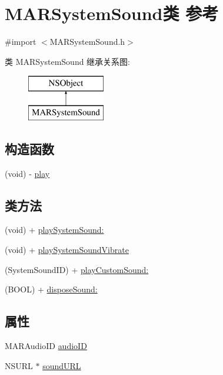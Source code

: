 \hypertarget{interface_m_a_r_system_sound}{}\section{M\+A\+R\+System\+Sound类 参考}
\label{interface_m_a_r_system_sound}


{\ttfamily \#import $<$M\+A\+R\+System\+Sound.\+h$>$}

类 M\+A\+R\+System\+Sound 继承关系图\+:\begin{figure}[H]
\begin{center}
\leavevmode
\includegraphics[height=2.000000cm]{interface_m_a_r_system_sound}
\end{center}
\end{figure}
\subsection*{构造函数}
\begin{DoxyCompactItemize}
\item 
(void) -\/ \hyperlink{interface_m_a_r_system_sound_abf84e563c880dd678ebd9dd2a67f56f0}{play}
\end{DoxyCompactItemize}
\subsection*{类方法}
\begin{DoxyCompactItemize}
\item 
(void) + \hyperlink{interface_m_a_r_system_sound_a448d46b9614cdc1f3025f8913614f866}{play\+System\+Sound\+:}
\item 
(void) + \hyperlink{interface_m_a_r_system_sound_aea3446e3a4f0d2ee28fab4b35194726e}{play\+System\+Sound\+Vibrate}
\item 
(System\+Sound\+ID) + \hyperlink{interface_m_a_r_system_sound_a9d63a5ea24a218591e9e44c29d1723c2}{play\+Custom\+Sound\+:}
\item 
(B\+O\+OL) + \hyperlink{interface_m_a_r_system_sound_a30bf4cccadfe19fd039df934977358c0}{dispose\+Sound\+:}
\end{DoxyCompactItemize}
\subsection*{属性}
\begin{DoxyCompactItemize}
\item 
M\+A\+R\+Audio\+ID \hyperlink{interface_m_a_r_system_sound_a69d3a85e05747da3e53df0d5f8138bd3}{audio\+ID}
\item 
N\+S\+U\+RL $\ast$ \hyperlink{interface_m_a_r_system_sound_a374f05fe291063a7884a57e50a7477a6}{sound\+U\+RL}
\end{DoxyCompactItemize}


